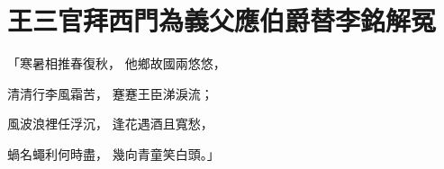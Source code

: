 %

\chapter{王三官拜西門為義父\KG 應伯爵替李銘解冤}


\begin{showcontents}{}




「寒暑相推春復秋，  他鄉故國兩悠悠，

清清行李風霜苦，  蹇蹇王臣涕淚流；

風波浪裡任浮沉，  逢花遇酒且寬愁，

蝸名蠅利何時盡，  幾向青童笑白頭。」


\end{showcontents}

